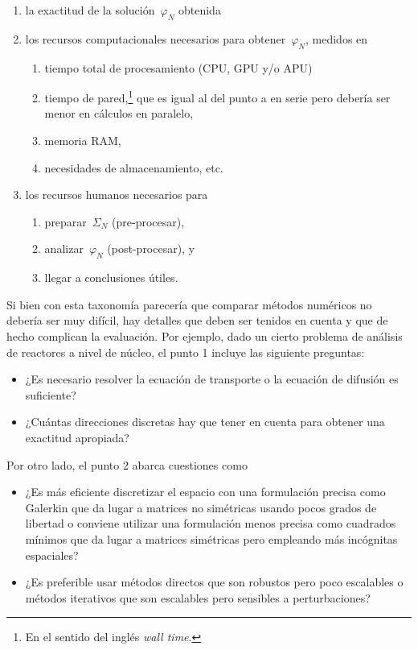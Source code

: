 \documentclass[
  12pt,
  a4paper,
  table]{scrbook}
\providecommand{\tightlist}{%
  \setlength{\itemsep}{0pt}\setlength{\parskip}{0pt}}\usepackage{longtable,booktabs,array}
\theoremstyle{plain}
\theoremstyle{definition}
\theoremstyle{plain}
\theoremstyle{plain}
\theoremstyle{remark}
\begin{document}
\begin{enumerate}
\def\labelenumi{\arabic{enumi}.}
\item
  la exactitud de la solución~\(\varphi_N\) obtenida
\item
  los recursos computacionales necesarios para obtener~\(\varphi_N\),
  medidos en

  \begin{enumerate}
  \def\labelenumii{\alph{enumii}.}
  \tightlist
  \item
    tiempo total de procesamiento (CPU, GPU y/o APU)
  \item
    tiempo de pared,\footnote{En el sentido del inglés
      \foreignlanguage{american}{\emph{wall time}}.} que es igual al del
    punto a en serie pero debería ser menor en cálculos en paralelo,
  \item
    memoria RAM,
  \item
    necesidades de almacenamiento, etc.
  \end{enumerate}
\item
  los recursos humanos necesarios para

  \begin{enumerate}
  \def\labelenumii{\alph{enumii}.}
  \tightlist
  \item
    preparar~\(\Sigma_N\) (pre-procesar),
  \item
    analizar~\(\varphi_N\) (post-procesar), y
  \item
    llegar a conclusiones útiles.
  \end{enumerate}
\end{enumerate}

Si bien con esta taxonomía parecería que comparar métodos numéricos no
debería ser muy difícil, hay detalles que deben ser tenidos en cuenta y
que de hecho complican la evaluación. Por ejemplo, dado un cierto
problema de análisis de reactores a nivel de núcleo, el punto 1 incluye
las siguiente preguntas:

\begin{itemize}
\tightlist
\item
  ¿Es necesario resolver la ecuación de transporte o la ecuación de
  difusión es suficiente?
\item
  ¿Cuántas direcciones discretas hay que tener en cuenta para obtener
  una exactitud apropiada?
\end{itemize}

Por otro lado, el punto 2 abarca cuestiones como

\begin{itemize}
\tightlist
\item
  ¿Es más eficiente discretizar el espacio con una formulación precisa
  como Galerkin que da lugar a matrices no simétricas usando pocos
  grados de libertad o conviene utilizar una formulación menos precisa
  como cuadrados mínimos que da lugar a matrices simétricas pero
  empleando más incógnitas espaciales?
\item
  ¿Es preferible usar métodos directos que son robustos pero poco
  escalables o métodos iterativos que son escalables pero sensibles a
  perturbaciones?
\end{itemize}
\end{document}
